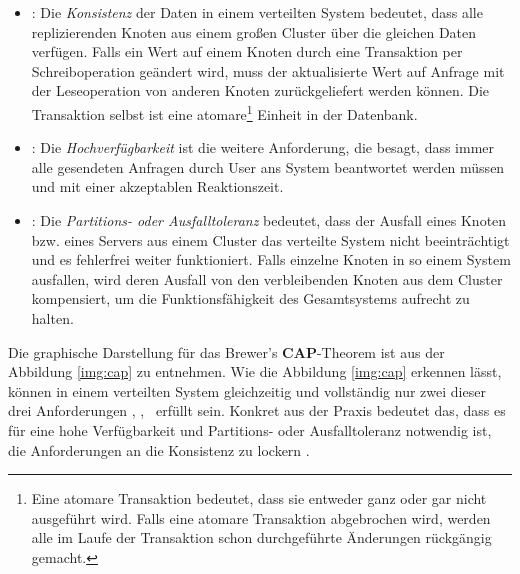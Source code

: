 \begin{itemize}
\item \Cap: Die \textit{Konsistenz} der Daten in einem verteilten System bedeutet, dass alle replizierenden Knoten aus einem großen Cluster über die gleichen Daten verfügen. Falls ein Wert auf einem Knoten durch eine Transaktion per Schreiboperation geändert wird, muss der aktualisierte Wert auf Anfrage mit der Leseoperation von anderen Knoten zurückgeliefert werden können. Die Transaktion selbst ist eine atomare\footnote{Eine atomare Transaktion bedeutet, dass sie entweder ganz oder gar nicht ausgeführt wird. Falls eine atomare Transaktion abgebrochen wird, werden alle im Laufe der Transaktion schon durchgeführte Änderungen rückgängig gemacht.} Einheit in der Datenbank.
\item \cAp: Die \textit{Hochverfügbarkeit} ist die weitere Anforderung, die besagt, dass immer alle gesendeten Anfragen durch User ans System beantwortet werden müssen und mit einer akzeptablen Reaktionszeit.
\item \caP: Die \textit{Partitions- oder Ausfalltoleranz} bedeutet, dass der Ausfall eines Knoten bzw. eines Servers aus einem Cluster das verteilte System nicht beeinträchtigt und es fehlerfrei weiter funktioniert. Falls einzelne Knoten in so einem System ausfallen, wird deren Ausfall von den verbleibenden Knoten aus dem Cluster kompensiert, um die Funktionsfähigkeit des Gesamtsystems aufrecht zu halten.

\end{itemize}

Die graphische Darstellung für das Brewer's \textbf{CAP}-Theorem ist aus der Abbildung \ref{img:cap} zu entnehmen. Wie die Abbildung \ref{img:cap} erkennen lässt, können in einem verteilten System gleichzeitig und vollständig nur zwei dieser drei Anforderungen  \Cap, \cAp, \caP\ erfüllt sein. Konkret aus der Praxis bedeutet das, dass es für eine hohe Verfügbarkeit und Partitions- oder Ausfalltoleranz notwendig ist, die Anforderungen an die Konsistenz zu lockern \cite[S. 31]{Edlich.2011}.

